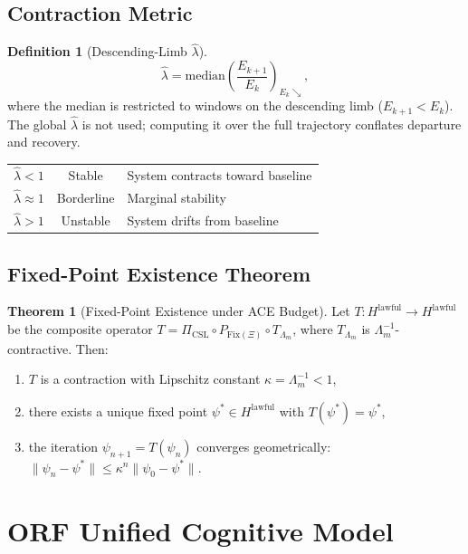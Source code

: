 \documentclass[12pt,a4paper]{article}
\theoremstyle{definition}
\newtheorem{definition}{Definition}[section]
\newtheorem{theorem}{Theorem}[section]
\newcommand{\Hlawful}{H^{\mathrm{lawful}}}
\newcommand{\Pcsll}{\Pi_{\mathrm{CSL}}}
\newcommand{\Lm}{\Lambda_m}
\newcommand{\lhat}{\hat{\lambda}}
\begin{document}
\subsection{Contraction Metric}

\begin{definition}[Descending-Limb $\lhat$]
  \begin{equation}\label{eq:lambda_hat}
    \lhat = \mathrm{median}\!\left(\frac{E_{k+1}}{E_k}\right)_{E_k \searrow},
  \end{equation}
  where the median is restricted to windows on the descending limb
  ($E_{k+1} < E_k$).  The global $\lhat$ is not used; computing it over
  the full trajectory conflates departure and recovery.
\end{definition}

\begin{longtable}{@{}lcl@{}}
  \toprule
  $\lhat < 1$ & Stable & System contracts toward baseline \\
  $\lhat \approx 1$ & Borderline & Marginal stability \\
  $\lhat > 1$ & Unstable & System drifts from baseline \\
  \bottomrule
\end{longtable}

\subsection{Fixed-Point Existence Theorem}

\begin{theorem}[Fixed-Point Existence under ACE Budget]
  Let $T : \Hlawful \to \Hlawful$ be the composite operator
  $T = \Pcsll \circ P_{\mathrm{Fix}(\Xi)} \circ T_{\Lm}$,
  where $T_{\Lm}$ is $\Lm^{-1}$-contractive.  Then:
  \begin{enumerate}[label=\alph*.]
    \item $T$ is a contraction with Lipschitz constant
          $\kappa = \Lm^{-1} < 1$,
    \item there exists a unique fixed point
          $\psi^* \in \Hlawful$ with $T(\psi^*) = \psi^*$,
    \item the iteration $\psi_{n+1} = T(\psi_n)$ converges geometrically:
          $\|\psi_n - \psi^*\| \leq \kappa^n \|\psi_0 - \psi^*\|$.
  \end{enumerate}
\end{theorem}

\section{ORF Unified Cognitive Model}
\end{document}
